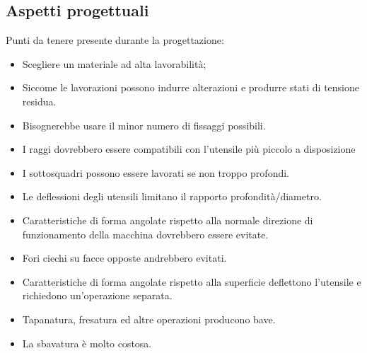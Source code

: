 \subsection{Aspetti progettuali}
Punti da tenere presente durante la progettazione:
\begin{itemize}
\item Scegliere un materiale ad alta lavorabilità;
\item Siccome le lavorazioni possono indurre alterazioni e produrre stati di tensione residua.
\item Bisognerebbe usare il minor numero di fissaggi possibili.
\item I raggi dovrebbero essere compatibili con l'utensile più piccolo a disposizione
\item I sottosquadri possono essere lavorati se non troppo profondi.
\item Le deflessioni degli utensili limitano il rapporto profondità/diametro.
\item Caratteristiche di forma angolate rispetto alla normale direzione di funzionamento della macchina dovrebbero essere evitate.
\item Fori ciechi su facce opposte andrebbero evitati.
\item Caratteristiche di forma angolate rispetto alla superficie deflettono l'utensile e richiedono un'operazione separata.
\item Tapanatura, fresatura ed altre operazioni producono bave.
\item La sbavatura è molto costosa.
\end{itemize}

